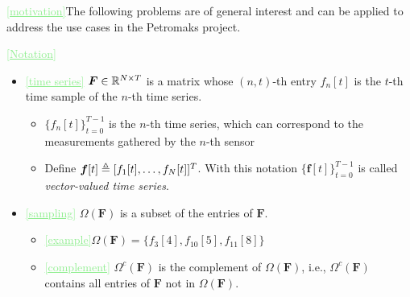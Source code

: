 \documentclass[11pt,final,onecolumn]{IEEEtran}
\newcommand{\cmt}[1]{\noindent\textcolor{lightgreen}{\underline{[#1]}}} %
\newcommand{\cmt}[1]{} %
\begin{document}
\cmt{motivation}The following problems are of general interest and can
be applied to address the use cases in the Petromaks project.

\cmt{Notation}
\begin{itemize}
\item\cmt{time series} $\bm F\in \mathbb{R}^{N \times T}$ is a matrix
  whose $(n,t)$-th entry $f_n[t]$ is the $t$-th time sample of the
  $n$-th time series.
  \begin{itemize}
  \item  $\{f_n[t]\}_{t=0}^{T-1}$ is the $n$-th time series, which can
    correspond to the measurements gathered by the $n$-th sensor
  \item Define $\bm f[t]\triangleq [f_1[t],\ldots,f_{N}[t]]^T$. With
    this notation $\{\bm f[t]\}_{t=0}^{T-1}$ is called
    \emph{vector-valued time series}.
  \end{itemize}
\item\cmt{sampling} $\Omega(\bm F)$ is a subset of the entries of $\bm F$.
  \begin{itemize}
  \item  \cmt{example}$\Omega(\bm F)
    =\{f_3[4],f_{10}[5],f_{11}[8]\}$
  \item\cmt{complement} $\Omega^c(\bm F)$ is the complement of $\Omega(\bm F)$, i.e.,
    $\Omega^c(\bm F)$ contains all entries of $\bm F$ not in $\Omega(\bm F)$.
\end{itemize}
\end{itemize}
\end{document}
